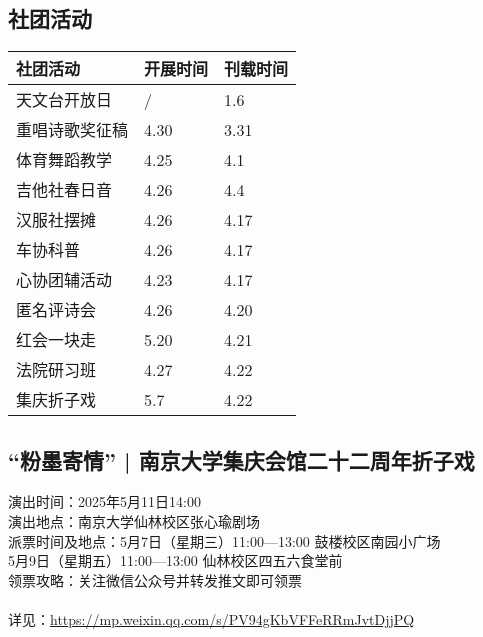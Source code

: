 \documentclass[letterpaper, 12pt]{article}
\begin{document}
\begin{multicols}{2}
\section{社团活动}
\begin{tabular}{|>{\centering\arraybackslash}m{}|m{}|m{}|}
    \hline
    社团活动 & 开展时间 & 刊载时间\\
    \hline\hline
    天文台开放日 & / & 1.6\\
    重唱诗歌奖征稿 & 4.30 & 3.31\\
    体育舞蹈教学 & 4.25 & 4.1\\
    吉他社春日音 & 4.26 & 4.4\\
    汉服社摆摊 & 4.26 & 4.17\\
    车协科普 & 4.26 & 4.17\\
    心协团辅活动 & 4.23 & 4.17\\
    匿名评诗会 & 4.26 & 4.20\\
    红会一块走 & 5.20 & 4.21\\
    法院研习班 & 4.27 & 4.22\\
    集庆折子戏 & 5.7 & 4.22\\
    \hline
\end{tabular}


\subsection{“粉墨寄情” | 南京大学集庆会馆二十二周年折子戏} %
演出时间：2025年5月11日14:00
\\演出地点：南京大学仙林校区张心瑜剧场
\\派票时间及地点：5月7日（星期三）11:00—13:00 鼓楼校区南园小广场
\\5月9日（星期五）11:00—13:00 仙林校区四五六食堂前
\\领票攻略：关注微信公众号并转发推文即可领票
\\
\\详见：\url{https://mp.weixin.qq.com/s/PV94gKbVFFeRRmJvtDjjPQ}

\end{multicols}
\end{document}

